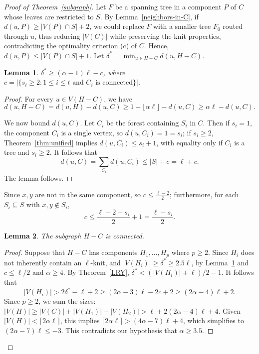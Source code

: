 \documentclass[11pt]{amsart}
\newtheorem{lemma}{Lemma}
\begin{document}
\begin{proof}[Proof of Theorem~\ref{subgraph}]
Let $F$ be a spanning tree in a component $P$ of $C$ whose leaves are restricted to $S$. By Lemma~\ref{neighbors-in-C}, if $d(u,P) \ge |V(P)\cap S| + 2$, we could replace $F$ with a smaller tree $F_0$ routed through $u$, thus reducing $|V(C)|$ while preserving the knit properties, contradicting the optimality criterion (c) of $C$. Hence, $d(u,P) \le |V(P)\cap S| + 1$. Let $\delta^*=\min_{u\in H-C} d(u, H-C)$. 
\fi %

\begin{lemma}\label{delta-star}
$\delta^* \ge (\alpha - 1)\ell-c$, where $c=|\{s_i\ge 2: 1\le i\le t \mbox{ and $C_i$ is connected}\}|$. 
\end{lemma}

\begin{proof}
For every $u\in V(H-C)$, we have $$d(u, H-C) = d(u,H) - d(u,C)\ge 1+\lfloor\alpha\ell\rfloor- d(u,C)\ge \alpha\ell-d(u,C).$$ 

We now bound $d(u,C)$. Let $C_i$ be the forest containing $S_i$ in $C$. Then if $s_i=1$, the component $C_i$ is a single vertex, so $d(u, C_i) = 1 = s_i$; if  $s_i\ge 2$, Theorem~\ref{thm:unified} implies $d(u, C_i)\le s_i+1$, with equality only if $C_i$ is a tree and $s_i\ge 2$. It follows that $$d(u, C) = \sum_{C_i} d(u,C_i) \le |S|+c=\ell+c.$$ The lemma follows.
\end{proof} 

Since $x,y$ are not in the same component, so $c\le \frac{\ell-2}{2}$;  furthermore, for each $S_i\subseteq S$ with $x,y\not\in S_i$, $$c\le \frac{\ell-2-s_i}{2}+1=\frac{\ell-s_i}{2}.$$

\begin{lemma}
The subgraph $H-C$ is connected.
\end{lemma}

\begin{proof}
Suppose that $H-C$ has components $H_1, \ldots, H_p$ where $p\ge 2$. Since $H_i$ does not inherently contain an $\ell$-knit, and $|V(H_i)|\ge \delta^*\ge 2.5\ell$, by Lemma~\ref{delta-star} and $c\le \ell/2$ and $\alpha\ge 4$. By Theorem~\ref{LRY}, $\delta^* < (|V(H_i)|+\ell)/2-1$. It follows that $$|V(H_i)| > 2\delta^*-\ell+2\ge (2\alpha-3)\ell-2c+2\ge (2\alpha-4)\ell+2.$$
Since $p \ge 2$, we sum the sizes:
$|V(H)| \ge |V(C)| + |V(H_1)| + |V(H_2)| > \ell + 2(2\alpha-4)\ell + 4$.
Given $|V(H)| < \lceil 2\alpha \ell\rceil$, this implies $\lceil 2\alpha \ell\rceil > (4\alpha-7)\ell + 4$, which simplifies to $(2\alpha-7)\ell\le -3$. This contradicts our hypothesis that $\alpha \ge 3.5$.
\end{proof}


\end{proof}
\end{document}
